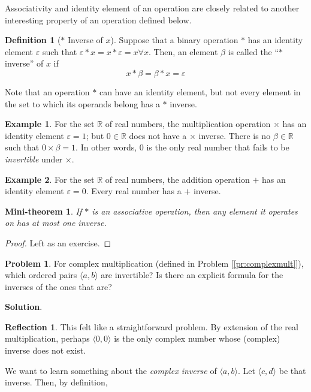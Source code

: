 \documentclass[english,notitlepage,smartquotes]{hgbreport}
\theoremstyle{definition}
\newtheorem{definition}{Definition}
\theoremstyle{definition}
\newtheorem{problem}{Problem}
\theoremstyle{remark}
\theoremstyle{plain}
\newtheorem{mini-theorem}{Mini-theorem}
\theoremstyle{definition}
\newtheorem{example}{Example}
\theoremstyle{definition}
\newtheorem{reflection}{Reflection}
\begin{document}
Associativity and identity element of an operation are closely related to another interesting property of an operation defined below.

\begin{definition}[$*$ Inverse of $x$] 
Suppose that a binary operation $*$ has an identity element $\varepsilon$ such that $\varepsilon*x=x*\varepsilon=x\forall x$. Then, an element $\beta$ is called the ``$*$ inverse'' of $x$ if 
$$
x*\beta=\beta*x=\varepsilon
$$
\end{definition}

Note that an operation $*$ can have an identity element, but not every element in the set to which its operands belong has a $*$ inverse.
\begin{example} For the set $\mathbb{R}$ of real numbers, the multiplication operation $\times$ has an identity element $\varepsilon=1$; but $0\in\mathbb{R}$ does not have a $\times$ inverse. There is no $\beta\in\mathbb{R}$ such that $0\times\beta=1$. In other words, $0$ is the only real number that fails to be \emph{invertible} under $\times$. 
\end{example}
\begin{example} For the set $\mathbb{R}$ of real numbers, the addition operation $+$ has an identity element $\varepsilon=0$. Every real number has a $+$ inverse.
\end{example}
\begin{mini-theorem}
If $*$ is an associative operation, then any element it operates on has at most one inverse.
\end{mini-theorem}
\begin{proof}
Left as an exercise.
\end{proof}

\begin{problem}
\label{pr:complexinv}
For complex multiplication (defined in Problem [\ref{pr:complexmult}]), which ordered pairs $\langle a,b\rangle$ are invertible? Is there an explicit formula for the inverses of the ones that are?
\end{problem}

\textbf{Solution}.

\begin{reflection}
This felt like a straightforward problem. By extension of the real multiplication, perhaps $\langle 0,0\rangle$ is the only complex number whose (complex) inverse does not exist.
\end{reflection}

We want to learn something about the \emph{complex inverse} of $\langle a,b\rangle$. Let $\langle c,d\rangle$ be that inverse. Then, by definition,
\end{document}
